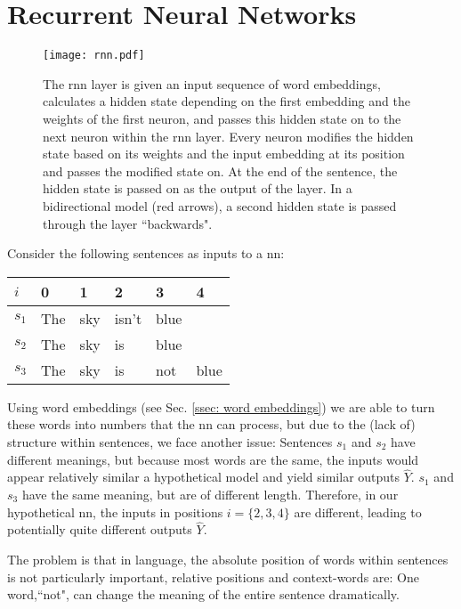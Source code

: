 \section{Recurrent Neural Networks \label{ssec: RNNs}}

    \begin{figure}[t]
        \centering
        \texttt{[image: rnn.pdf]}
        \caption{The \gls{rnn} layer is given an input sequence of word \glspl{embedding}, calculates a hidden state depending on the first \gls{embedding} and the weights of the first neuron, and passes this hidden state on to the next neuron within the \gls{rnn} layer. Every neuron modifies the hidden state based on its weights and the input \gls{embedding} at its position and passes the modified state on. At the end of the sentence, the hidden state is passed on as the output of the layer. In a bidirectional model (red arrows), a second hidden state is passed through the layer ``backwards".}
        \label{fig:rnn}
    \end{figure}
    Consider the following sentences as inputs to a \gls{nn}: 
    
    \begin{table}[H]
    \begin{tabular}{|l|l|l|l|l|l|}
        \hline
        $i$   & 0   & 1   & 2     & 3    & 4    \\ \hline
        $s_1$ & The & sky & isn't & blue &      \\ \hline
        $s_2$ & The & sky & is    & blue &      \\ \hline
        $s_3$ & The & sky & is    & not  & blue \\ \hline
    \end{tabular}
    \centering
    \end{table}
    \noindent Using word \glspl{embedding} (see Sec. \ref{ssec: word embeddings}) we are able to turn these words into numbers that the \gls{nn} can process, but due to the (lack of) structure within sentences, we face another issue:
    Sentences $s_1$ and $s_2$ have different meanings, but because most words are the same, the inputs would appear relatively similar a hypothetical \gls{model} and yield similar outputs $\hat{Y}$. $s_1$ and $s_3$ have the same meaning, but are of different length. Therefore, in our hypothetical \gls{nn}, the inputs in positions $i = \{2, 3, 4\}$ are different, leading to potentially quite different outputs $\hat{Y}$.
    
    The problem is that in language, the absolute position of words within sentences is not particularly important, relative positions and context-words are: One word,``not", can change the meaning of the entire sentence dramatically.
    
